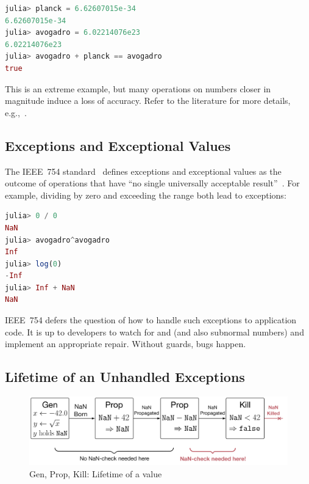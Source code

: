 \documentclass{juliacon}
\begin{document}
\begin{lstlisting}[language = Julia]
julia> planck = 6.62607015e-34
6.62607015e-34
julia> avogadro = 6.02214076e23
6.02214076e23
julia> avogadro + planck == avogadro
true
\end{lstlisting}

This is an extreme example, but many operations on \fp{} numbers closer in magnitude induce a loss of accuracy.
Refer to the literature for more details, e.g.,~\cite{knuthArtComputerProgramming1997,torontoPracticallyAccurateFloatingPoint2014,mullerHandbookFloatingPointArithmetic2018}.


\subsection{Exceptions and Exceptional Values}
\label{s:exnvalue}

The IEEE~754 \fp{} standard~\cite{IEEEStandardBinary1985}
defines exceptions and exceptional values as the outcome of
operations that have ``no single universally acceptable result''~\cite{p-draft-1997}.
For example, dividing by zero and exceeding the  range
both lead to exceptions:

\begin{lstlisting}[language = Julia]
julia> 0 / 0
NaN
julia> avogadro^avogadro
Inf
julia> log(0)
-Inf
julia> Inf + NaN
NaN
\end{lstlisting}

IEEE~754 defers the question of how to handle such exceptions to application code.
It is up to developers to watch for \Nan{} and \Inf{} (and also subnormal numbers)
and implement an appropriate repair.
Without guards, bugs happen.


\subsection{Lifetime of an Unhandled Exceptions}
\label{s:to-kill-a-fp}

\begin{figure}[t]
  \includegraphics[width=\columnwidth]{fig/genpropkill-outline.png}
  \caption{Gen, Prop, Kill: Lifetime of a \NaN{} value}
  \label{f:gpk}
\end{figure}
\end{document}
